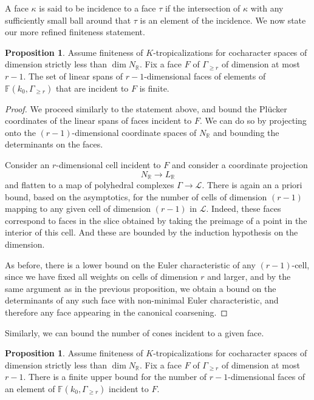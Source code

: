 \documentclass[11pt]{amsart}
\theoremstyle{definition}
\theoremstyle{definition}
\newtheorem{proposition}[theorem]{Proposition}
\begin{document}
A face $\kappa$ is said to be incidence to a face $\tau$ if the intersection of $\kappa$ with any sufficiently small ball around that $\tau$ is an element of the incidence. We now state our more refined finiteness statement. 

\begin{proposition}\label{prop: directions-bounded-at-faces}
Assume finiteness of $K$-tropicalizations for cocharacter spaces of dimension strictly less than $\dim N_{\mathbb R}$. Fix a face $F$ of $\Gamma_{\geq r}$ of dimension at most $r-1$. The set of linear spans of $r-1$-dimensional faces of elements of $\mathbb F(k_0,\Gamma_{\geq r})$ that are incident to $F$ is finite. 
\end{proposition}

\begin{proof}
We proceed similarly to the statement above, and bound the Pl\"ucker coordinates of the linear spans of faces incident to $F$. We can do so by projecting onto the $(r-1)$-dimensional coordinate spaces of $N_{\mathbb R}$ and bounding the determinants on the faces. 

Consider an $r$-dimensional cell incident to $F$ and consider a coordinate projection
\[
N_{\mathbb R}\to L_{\mathbb R}
\]
and flatten to a map of polyhedral complexes $\Gamma\to\mathcal L$. There is again an a priori bound, based on the asymptotics, for the number of cells of dimension $(r-1)$ mapping to any given cell of dimension $(r-1)$ in $\mathcal L$. Indeed, these faces correspond to faces in the slice obtained by taking the preimage of a point in the interior of this cell. And these are bounded by the induction hypothesis on the dimension. 

As before, there is a lower bound on the Euler characteristic of any $(r-1)$-cell, since we have fixed all weights on cells of dimension $r$ and larger, and by the same argument as in the previous proposition, we obtain a bound on the determinants of any such face with non-minimal Euler characteristic, and therefore any face appearing in the canonical coarsening. 
\end{proof}

Similarly, we can bound the number of cones incident to a given face. 

\begin{proposition}\label{prop: incidence is bounded}
Assume finiteness of $K$-tropicalizations for cocharacter spaces of dimension strictly less than $\dim N_{\mathbb R}$. Fix a face $F$ of $\Gamma_{\geq r}$ of dimension at most $r-1$. There is a finite upper bound for the number of $r-1$-dimensional faces of an element of $\mathbb F(k_0,\Gamma_{\geq r})$ incident to $F$. 
\end{proposition}
\end{document}
